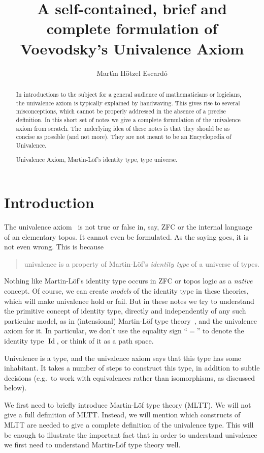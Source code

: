 \documentclass{article}
\title{A self-contained, brief and complete formulation of Voevodsky's Univalence Axiom}
\author{Mart{\'\i}n H\"otzel Escard\'o}
\newcommand{\Id}{\operatorname{Id}}
\begin{document}
\maketitle

\begin{abstract}
  In introductions to the subject for a general audience of
  mathematicians or logicians, the univalence axiom is typically
  explained by handwaving. This gives rise to several misconceptions,
  which cannot be properly addressed in the absence of a precise
  definition. In this short set of notes we give a complete
  formulation of the univalence axiom from scratch. The underlying
  idea of these notes is that they should be as concise as possible
  (and not more). They are not meant to be an Encyclopedia of
  Univalence.

  \medskip {} Univalence Axiom, Martin-L\"of's identity type, type universe.
\end{abstract}

\section{Introduction}

The univalence axiom~\cite{unimath,hottbook,grayson} is not true or false
in, say, ZFC or the internal language of an elementary topos. It
cannot even be formulated. As the saying goes, it is not even wrong.
%
This is because
\begin{quote}
   univalence is a property of Martin-L\"of's \emph{identity type}
   of a universe of types.
\end{quote}
Nothing like Martin-L\"of's identity type occurs in ZFC or topos logic
as a \emph{native} concept. Of course, we can create \emph{models} of
the identity type in these theories, which will make univalence hold
or fail. But in these notes we try to understand the primitive concept
of identity type, directly and independently of any such particular
model, as in (intensional) Martin-L\"of type theory~\cite{MR1686864}, and the univalence axiom for it. In
particular, we don't use the equality sign ``$=$'' to denote the
identity type $\Id$, or think of it as a path space.


Univalence is a type, and the univalence axiom says that this type has
some inhabitant. It takes a number of steps to construct this type, in
addition to subtle decisions (e.g.\ to work with equivalences rather
than isomorphisms, as discussed below).

We first need to briefly introduce Martin-L\"of type theory (MLTT). We
will not give a full definition of MLTT. Instead, we will mention
which constructs of MLTT are needed to give a complete definition of
the univalence type. This will be enough to illustrate the important
fact that in order to understand univalence we first need to
understand Martin-L\"of type theory well.
\end{document}
